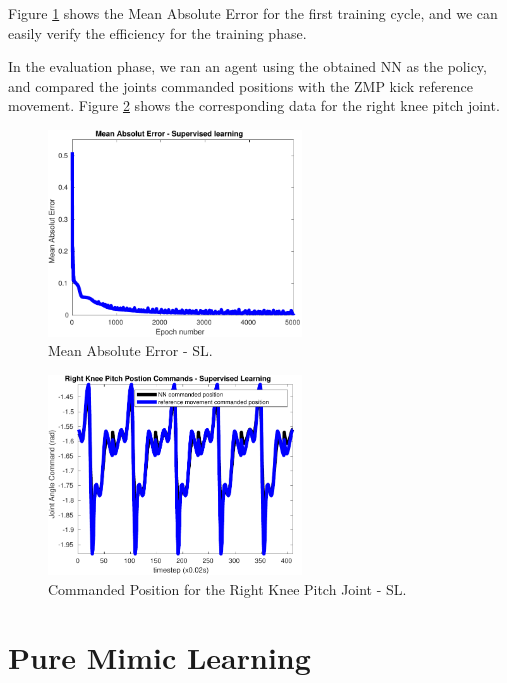 Figure \ref{fig:SL_MAE} shows the Mean Absolute Error for the first training cycle, and we can easily verify the efficiency for the training phase.

In the evaluation phase, we ran an agent using the obtained NN as the policy, and compared the joints commanded positions with the ZMP kick reference movement. Figure \ref{fig:SL_cmd_pos} shows the corresponding data for the right knee pitch joint.

\begin{figure}[H]
    \centering
    \includegraphics[width=0.6\textwidth]{Chapter7/plots/plot_MAE_supervised.pdf} 
    \caption{Mean Absolute Error - SL.}
    \label{fig:SL_MAE}
\end{figure}

\begin{figure}[H]
    \centering
    \includegraphics[width=0.6\textwidth]{Chapter7/plots/plot_joints_pos_superv.pdf} 
    \caption{Commanded Position for the Right Knee Pitch Joint - SL.}
    \label{fig:SL_cmd_pos}
\end{figure}

\section{Pure Mimic Learning}

